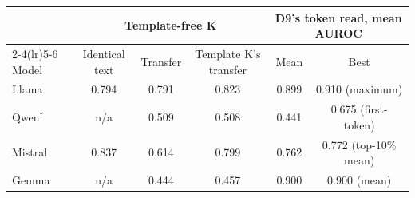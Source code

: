 \begin{tabular}{@{}l ccc cc@{}}
\toprule
 & \multicolumn{3}{c}{Template-free K} & \multicolumn{2}{c}{D9's token read, mean AUROC} \\
\cmidrule(lr){2-4}\cmidrule(lr){5-6}
Model & Identical text & Transfer & Template K's transfer & Mean & Best \\
\midrule
Llama & 0.794 & 0.791 & 0.823 & 0.899 & 0.910 (maximum) \\
Qwen$^\dagger$ & n/a & 0.509 & 0.508 & 0.441 & 0.675 (first-token) \\
Mistral & 0.837 & 0.614 & 0.799 & 0.762 & 0.772 (top-10\% mean) \\
Gemma & n/a & 0.444 & 0.457 & 0.900 & 0.900 (mean) \\
\bottomrule
\end{tabular}
